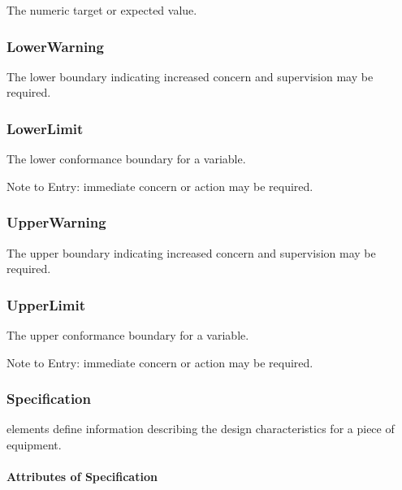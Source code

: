 The numeric target or expected value.


\subsubsection{LowerWarning}
\label{sec:LowerWarning}



The lower boundary indicating increased concern and supervision may be required.


\subsubsection{LowerLimit}
\label{sec:LowerLimit}



The lower conformance boundary for a variable.

Note to Entry: immediate concern or action may be required.


\subsubsection{UpperWarning}
\label{sec:UpperWarning}



The upper boundary indicating increased concern and supervision may be required.


\subsubsection{UpperLimit}
\label{sec:UpperLimit}



The upper conformance boundary for a variable.

Note to Entry: immediate concern or action may be required.



\subsubsection{Specification}
\label{sec:Specification}



 elements define information describing the design characteristics for a piece of equipment.



\paragraph{Attributes of Specification}\mbox{}
\label{sec:Attributes of Specification}

